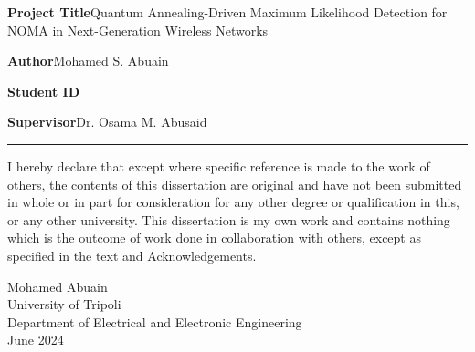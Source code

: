 \begin{declaration}

\noindent\textbf{Project Title}\quad Quantum Annealing-Driven Maximum Likelihood Detection for NOMA in Next-Generation Wireless Networks

\noindent\textbf{Author}\quad Mohamed S. Abuain

\noindent\textbf{Student ID}

\noindent\textbf{Supervisor}\quad Dr. Osama M. Abusaid

\medskip\hrule\medskip

I hereby declare that except where specific reference is made to the work of others, the contents of this dissertation are original and have not been submitted in whole or in part for consideration for any other degree or qualification in this, or any other university. This dissertation is my own work and contains nothing which is the outcome of work done in collaboration with others, except as specified in the text and Acknowledgements.

\begin{flushright}
Mohamed Abuain\\
University of Tripoli\\
Department of Electrical and Electronic Engineering\\
June 2024
\end{flushright}

\end{declaration}

